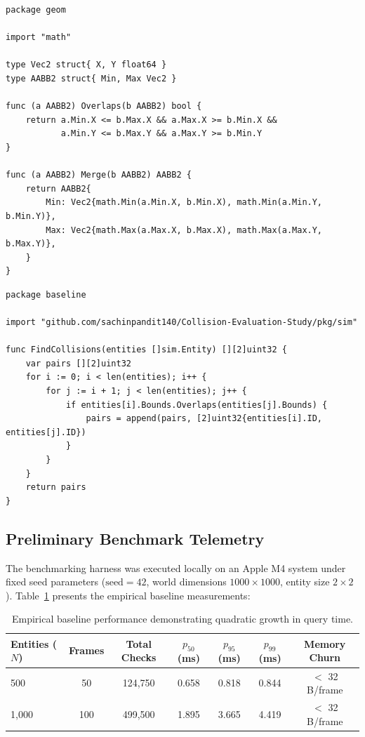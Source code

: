 \documentclass[12pt]{article}
\begin{document}
\begin{lstlisting}[style=gostyle, caption={\texttt{AABB2} overlap and bounding box merge (\texttt{pkg/geom/aabb.go})}]
package geom

import "math"

type Vec2 struct{ X, Y float64 }
type AABB2 struct{ Min, Max Vec2 }

func (a AABB2) Overlaps(b AABB2) bool {
    return a.Min.X <= b.Max.X && a.Max.X >= b.Min.X &&
           a.Min.Y <= b.Max.Y && a.Max.Y >= b.Min.Y
}

func (a AABB2) Merge(b AABB2) AABB2 {
    return AABB2{
        Min: Vec2{math.Min(a.Min.X, b.Min.X), math.Min(a.Min.Y, b.Min.Y)},
        Max: Vec2{math.Max(a.Max.X, b.Max.X), math.Max(a.Max.Y, b.Max.Y)},
    }
}
\end{lstlisting}

\begin{lstlisting}[style=gostyle, caption={$O(N^2)$ brute-force baseline candidate pair generation (\texttt{pkg/baseline/brute.go})}]
package baseline

import "github.com/sachinpandit140/Collision-Evaluation-Study/pkg/sim"

func FindCollisions(entities []sim.Entity) [][2]uint32 {
    var pairs [][2]uint32
    for i := 0; i < len(entities); i++ {
        for j := i + 1; j < len(entities); j++ {
            if entities[i].Bounds.Overlaps(entities[j].Bounds) {
                pairs = append(pairs, [2]uint32{entities[i].ID, entities[j].ID})
            }
        }
    }
    return pairs
}
\end{lstlisting}

\subsection{Preliminary Benchmark Telemetry}

The benchmarking harness was executed locally on an Apple M4 system under fixed seed parameters ($\text{seed}=42$, world dimensions $1000 \times 1000$, entity size $2 \times 2$). Table~\ref{tab:benchmarks} presents the empirical baseline measurements:

\begin{table}[ht]
\centering
\small
\begin{tabular}{lcccccc}
\toprule
\textbf{Entities ($N$)} & \textbf{Frames} & \textbf{Total Checks} & \textbf{$p_{50}$ (ms)} & \textbf{$p_{95}$ (ms)} & \textbf{$p_{99}$ (ms)} & \textbf{Memory Churn} \\
\midrule
500   & 50  & 124,750   & 0.658 & 0.818 & 0.844 & $<$ 32 B/frame \\
1,000 & 100 & 499,500   & 1.895 & 3.665 & 4.419 & $<$ 32 B/frame \\
\bottomrule
\end{tabular}
\caption{Empirical baseline performance demonstrating quadratic growth in query time.}
\label{tab:benchmarks}
\end{table}
\end{document}
